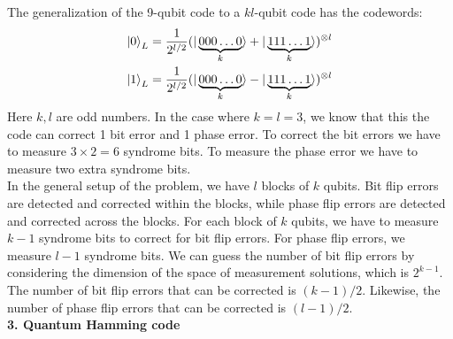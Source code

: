 \documentclass{article}
\theoremstyle{definition}
\newcommand{\f}[2]{\frac{#1}{#2}}
\begin{document}
\noindent The generalization of the 9-qubit code to a $kl$-qubit code has the codewords:
\begin{align*}
	\ket{0}_L = \f{1}{2^{l/2}} ( |\underbrace{000\dots 0}_{k}\rangle + |\underbrace{111\dots 1}_{k}\rangle )^{\otimes l} \\
	\ket{1}_L = \f{1}{2^{l/2}} ( |\underbrace{000\dots 0}_{k}\rangle - |\underbrace{111\dots 1}_{k}\rangle )^{\otimes l}
\end{align*}
Here $k,l$ are odd numbers. In the case where $k=l=3$, we know that this the code can correct 1 bit error and 1 phase error. To correct the bit errors we have to measure $3\times 2 = 6$ syndrome bits. To measure the phase error we have to measure two extra syndrome bits.\\

In the general setup of the problem, we have $l$ blocks of $k$ qubits. Bit flip errors are detected and corrected within the blocks, while phase flip errors are detected and corrected across the blocks. For each block of $k$ qubits, we have to measure $k-1$ syndrome bits to correct for bit flip errors. For phase flip errors, we measure $l-1$ syndrome bits. We can guess the number of bit flip errors by considering the dimension of the space of measurement solutions, which is $2^{k-1}$. The number of bit flip errors that can be corrected is $(k-1)/2$. Likewise, the number of phase flip errors that can be corrected is $(l-1)/2$.\\





\noindent \textbf{3. Quantum Hamming code}\\
\end{document}
